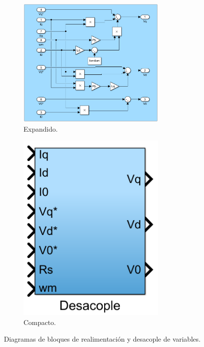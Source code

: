 \documentclass{article}
\begin{document}
\begin{figure}[H]
    \begin{subfigure}[b]{0.75\textwidth}
        \centering
        \includegraphics[width=0.8\textwidth]{desacople_expandido.png}
        \caption{Expandido.}
    \end{subfigure}
    \begin{subfigure}[b]{0.24\textwidth}
        \centering
        \includegraphics[width=0.8\textwidth]{desacople.png}
        \caption{Compacto.}
    \end{subfigure}
    \caption{Diagramas de bloques de realimentación y desacople de variables.}
\end{figure}
\end{document}
